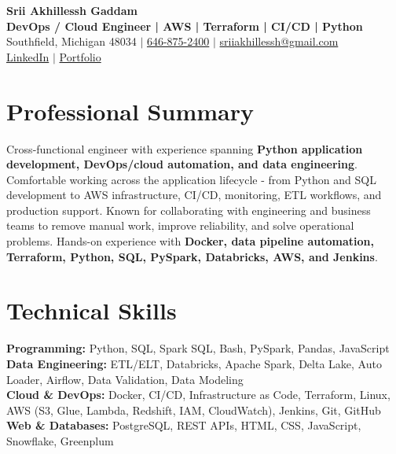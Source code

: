 \documentclass[letterpaper,10pt]{article}
\begin{document}
\fontsize{9.35pt}{10.45pt}\selectfont

\begin{center}
    {\LARGE \textbf{Srii Akhillessh Gaddam}} \\[-1pt]
    \textbf{DevOps / Cloud Engineer | AWS | Terraform | CI/CD | Python} \\[2pt]
    Southfield, Michigan 48034 $|$
    \href{tel:6468752400}{646-875-2400} $|$
    \href{mailto:sriiakhillessh@gmail.com}{sriiakhillessh@gmail.com} \\[1pt]
    \href{https://www.linkedin.com/in/srii-akhiilessh-gaddam-b48668191/}{LinkedIn} $|$
    \href{https://sriiakhillesshg.github.io/portfolio/}{Portfolio}
\end{center}
\vspace{-8pt}

\section{Professional Summary}
\small{Cross-functional engineer with experience spanning \textbf{Python application development, DevOps/cloud automation, and data engineering}. Comfortable working across the application lifecycle - from Python and SQL development to AWS infrastructure, CI/CD, monitoring, ETL workflows, and production support. Known for collaborating with engineering and business teams to remove manual work, improve reliability, and solve operational problems. Hands-on experience with \textbf{Docker, data pipeline automation, Terraform, Python, SQL, PySpark, Databricks, AWS, and Jenkins}.}

\section{Technical Skills}
\small{
\textbf{Programming:} Python, SQL, Spark SQL, Bash, PySpark, Pandas, JavaScript \\
\textbf{Data Engineering:} ETL/ELT, Databricks, Apache Spark, Delta Lake, Auto Loader, Airflow, Data Validation, Data Modeling \\
\textbf{Cloud \& DevOps:} Docker, CI/CD, Infrastructure as Code, Terraform, Linux, AWS (S3, Glue, Lambda, Redshift, IAM, CloudWatch), Jenkins, Git, GitHub \\
\textbf{Web \& Databases:} PostgreSQL, REST APIs, HTML, CSS, JavaScript, Snowflake, Greenplum
}
\end{document}
